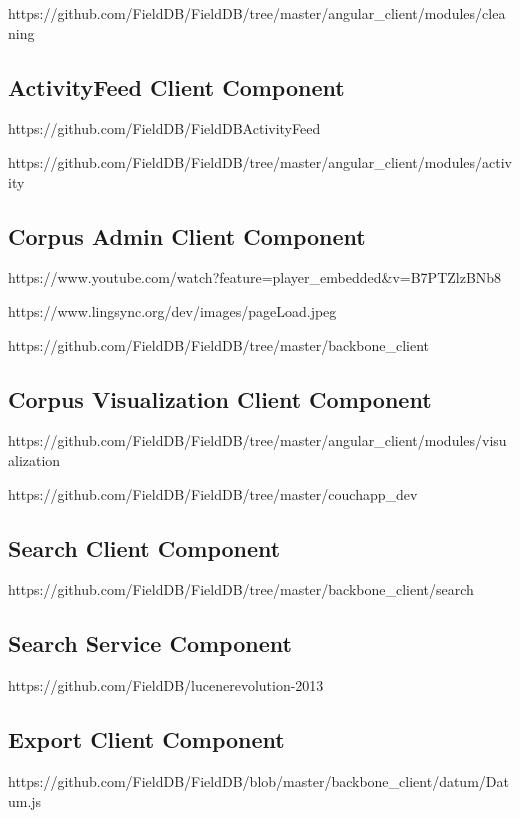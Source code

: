 \documentclass[12pt]{article}
\begin{document}
https://github.com/FieldDB/FieldDB/tree/master/angular\_client/modules/cleaning

\subsection{ActivityFeed Client Component}

https://github.com/FieldDB/FieldDBActivityFeed


https://github.com/FieldDB/FieldDB/tree/master/angular\_client/modules/activity

\subsection{Corpus Admin Client Component}

https://www.youtube.com/watch?feature=player\_embedded\&v=B7PTZlzBNb8

https://www.lingsync.org/dev/images/pageLoad.jpeg

https://github.com/FieldDB/FieldDB/tree/master/backbone\_client

\subsection{Corpus Visualization Client Component}

https://github.com/FieldDB/FieldDB/tree/master/angular\_client/modules/visualization

https://github.com/FieldDB/FieldDB/tree/master/couchapp\_dev

\subsection{Search Client Component}


https://github.com/FieldDB/FieldDB/tree/master/backbone_client/search


\subsection{Search Service Component}

https://github.com/FieldDB/lucenerevolution-2013


\subsection{Export Client Component}

https://github.com/FieldDB/FieldDB/blob/master/backbone_client/datum/Datum.js
\end{document}
